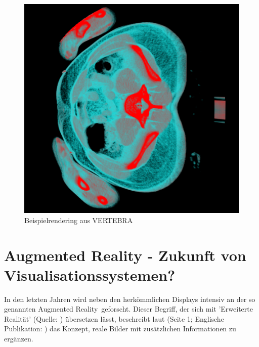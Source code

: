 \documentclass[pdftex,a4paper,titlepage,12pt]{scrartcl}
\newtheorem[L]{boxedDefinition}{Definition}
\begin{document}
\begin{figure}[p]
\begin{center}
\includegraphics[width=\textwidth]{graphics/vertebra-screenshot-1.png}
\caption{Beispielrendering aus VERTEBRA}
\label{fig:vertebra-screenshot}
\end{center}
\end{figure}\label{ssec:implementations}

\section{Augmented Reality - Zukunft von Visualisationssystemen?}\label{sec:augmentedreality}
In den letzten Jahren wird neben den herkömmlichen Displays intensiv an der so genannten \glqq Augmented Reality\grqq\ geforscht. Dieser Begriff, der sich mit 'Erweiterte Realität' (Quelle: \cite[Seite 1]{Toe2010}) übersetzen lässt, beschreibt laut \cite{Suthau2002DE} (Seite 1; Englische Publikation: \cite{Suthau2002}) das Konzept, reale Bilder mit zusätzlichen Informationen zu ergänzen.
\end{document}
